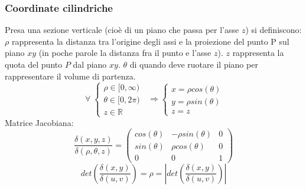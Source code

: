 \subsubsection{Coordinate cilindriche}
Presa una sezione verticale (cioè di un piano che passa per l'asse $z$) si definiscono:\newline
$\rho$ rappresenta la distanza tra l'origine degli assi e la proiezione del punto P sul piano $xy$ (in poche parole la distanza fra il punto e l'asse $z$).\newline
$z$ rappresenta la quota del punto $P$ dal piano $xy$.\newline
$\theta$ di quando deve ruotare il piano per rappresentare il volume di partenza.
\[
    \;\forall\; \begin{cases}
        \rho \in [0,\infty)\\
        \theta \in [0,2\pi)\\
        z \in \mathbb{R}
    \end{cases} \;\; \Longrightarrow \begin{cases}
        x = \rho cos(\theta)\\
        y = \rho sin(\theta)\\
        z = z
    \end{cases}
\]
Matrice Jacobiana:
\[
    \frac{\delta(x,y,z)}{\delta(\rho,\theta,z)} = \left(
    \begin{matrix}
        cos(\theta) & -\rho sin(\theta) & 0\\ 
        sin(\theta) & \rho cos(\theta) & 0 \\ 
        0 & 0 & 1
    \end{matrix}\right)
\]
\[
    det(\frac{\delta(x,y)}{\delta(u,v)}) = \rho = \left|det(\frac{\delta(x,y)}{\delta(u,v)})\right|
\]
